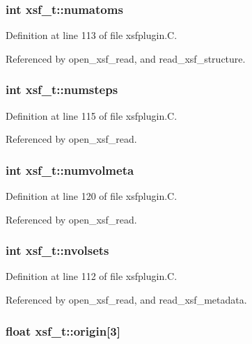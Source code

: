\subsubsection{\setlength{\rightskip}{0pt plus 5cm}int xsf\_\-t::numatoms}\label{structxsf__t_m2}




Definition at line 113 of file xsfplugin.C.

Referenced by open\_\-xsf\_\-read, and read\_\-xsf\_\-structure.
\subsubsection{\setlength{\rightskip}{0pt plus 5cm}int xsf\_\-t::numsteps}\label{structxsf__t_m4}




Definition at line 115 of file xsfplugin.C.

Referenced by open\_\-xsf\_\-read.
\subsubsection{\setlength{\rightskip}{0pt plus 5cm}int xsf\_\-t::numvolmeta}\label{structxsf__t_m9}




Definition at line 120 of file xsfplugin.C.

Referenced by open\_\-xsf\_\-read.
\subsubsection{\setlength{\rightskip}{0pt plus 5cm}int xsf\_\-t::nvolsets}\label{structxsf__t_m1}




Definition at line 112 of file xsfplugin.C.

Referenced by open\_\-xsf\_\-read, and read\_\-xsf\_\-metadata.
\subsubsection{\setlength{\rightskip}{0pt plus 5cm}float xsf\_\-t::origin[3]}\label{structxsf__t_m10}




